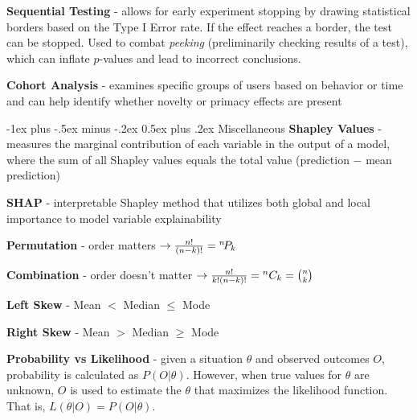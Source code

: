 \documentclass[10pt,landscape]{article}
\makeatletter
\renewcommand{\section}{\@startsection{section}{1}{0mm}%
                                {-1ex plus -.5ex minus -.2ex}%
                                {0.5ex plus .2ex}%
                                {\normalfont\large\bfseries}}
\makeatother
\begin{document}
\begin{multicols}{3}
\textbf{Sequential Testing} - allows for early experiment stopping by drawing statistical borders based on the Type I Error rate. If the effect reaches a border, the test can be stopped. Used to combat \emph{peeking} (preliminarily checking results of a test), which can inflate $p$-values and lead to incorrect conclusions.

\textbf{Cohort Analysis} - examines specific groups of users based on behavior or time and can help identify whether novelty or primacy effects are present

\section{Miscellaneous}
\textbf{Shapley Values} - measures the marginal contribution of each variable in the output of a model, where the sum of all Shapley values equals the total value (prediction $-$ mean prediction)

\textbf{SHAP} - interpretable Shapley method that utilizes both global and local importance to model variable explainability

\textbf{Permutation} - order matters  $\to \frac{n!}{(n-k)!} = {}^{n}\!P_{k}$

\textbf{Combination} - order doesn't matter $\to \frac{n!}{k!(n-k)!}= {}^{n}C_{k}= \binom nk$

\textbf{Left Skew} - Mean $<$ Median $\leq$ Mode

\textbf{Right Skew} - Mean $>$ Median $\geq$ Mode

\textbf{Probability vs Likelihood} - given a situation $\theta$ and observed outcomes $O$, probability is calculated as $P(O|\theta)$. However, when true values for $\theta$ are unknown, $O$ is used to estimate the $\theta$ that maximizes the likelihood function. That is, $L(\theta|O) = P(O|\theta)$.
\newpage
\end{multicols}
\end{document}
